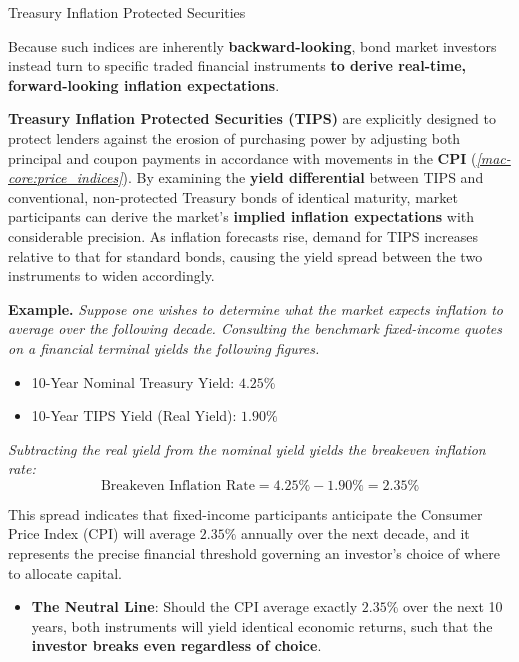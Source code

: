 \documentclass[10pt]{article}
\begin{document}
    \begin{core}{Treasury Inflation Protected Securities}

      Because such indices are inherently \textbf{backward-looking}, bond market investors instead turn to specific traded financial instruments \textbf{to derive real-time, forward-looking inflation expectations}.

      \textbf{Treasury Inflation Protected Securities (TIPS)} are explicitly designed to protect lenders against the erosion of purchasing power by adjusting both principal and coupon payments in accordance with movements in the \textbf{CPI} (\textit{\autoref{mac-core:price_indices}}). By examining the \textbf{yield differential} between TIPS and conventional, non-protected Treasury bonds of identical maturity, market participants can derive the market's \textbf{implied inflation expectations} with considerable precision. As inflation forecasts rise, demand for TIPS increases relative to that for standard bonds, causing the yield spread between the two instruments to widen accordingly.

      \textbf{Example.} \textit{Suppose one wishes to determine what the market expects inflation to average over the following decade. Consulting the benchmark fixed-income quotes on a financial terminal yields the following figures.}

      \begin{itemize}

        \item 10-Year Nominal Treasury Yield: $4.25\%$

        \item 10-Year TIPS Yield (Real Yield): $1.90\%$

      \end{itemize}

      \textit{Subtracting the real yield from the nominal yield yields the breakeven inflation rate:}
      \[
        \text{Breakeven Inflation Rate} = 4.25\% - 1.90\% = 2.35\%
      \]

      This spread indicates that fixed-income participants anticipate the Consumer Price Index (CPI) will average $2.35\%$ annually over the next decade, and it represents the precise financial threshold governing an investor's choice of where to allocate capital.

      \begin{itemize}

        \item \textbf{The Neutral Line}: Should the CPI average exactly $2.35\%$ over the next 10 years, both instruments will yield identical economic returns, such that the \textbf{investor breaks even regardless of choice}.


\end{itemize}
\end{core}
\end{document}
